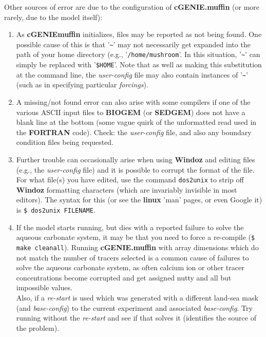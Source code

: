 \documentclass[11pt,fleqn]{book} %
\begin{document}
\noindent Other sources of error are due to the configuration of \textbf{cGENIE.muffin} (or more rarely, due to the model itself):

\vspace{1mm}
\begin{enumerate}

\vspace{1mm}
\item As \textbf{cGENIEmuffin} initializes, files may be reported as not being found. One possible cause of this is that '\texttt{\~{}}' may not necessarily get expanded into the path of your home directory (e.g., '\texttt{/home/mushroom}'. In this situation, '\texttt{\~{}}' can simply be replaced with '\texttt{\$HOME}'. Note that as well as making this substitution at the command line, the \textit{user-config} file may also contain instances of '\texttt{\~{}}' (such as in specifying particular \textit{forcings}).

\vspace{1mm}
\item A missing/not found error can also arise with some compilers if one of the various ASCII input files to \textbf{BIOGEM} (or \textbf{SEDGEM}) does not have a blank line at the bottom (some vague quirk of the unformatted read used in the \textbf{FORTRAN} code). Check: the \textit{user-config} file, and also any boundary condition files being requested.

\vspace{1mm}
\item Further trouble can occasionally arise when using \textbf{Windoz} and editing files (e.g., the \textit{user-config} file) and it is possible to corrupt the format of the file. For what file(s) you have edited, use the command \texttt{dos2unix} to strip off \textbf{Windoz} formatting characters (which are invariably invisible in most editors). The syntax for this (or see the \textbf{linux} 'man' pages, or even Google it) is \texttt{\$ dos2unix FILENAME}.

\vspace{1mm}
\item If the model starts running, but dies with a reported failure to solve the aqueous carbonate system, it may be that you need to force a re-compile (\texttt{\$ make cleanall}). Running \textbf{cGENIE.muffin} with array dimensions which do not match the number of tracers selected is a common cause of failures to solve the aqueous carbonate system, as often calcium ion or other tracer concentrations become corrupted and get assigned nutty and all but impossible values.
\\Also, if a \textit{re-start} is used which was generated with a different land-sea mask (and \textit{base-config}) to the current experiment and associated \textit{base-config}. Try running without the \textit{re-start} and see if that solves it (identifies the source of the problem).

\end{enumerate}
\vspace{2mm}
\end{document}
